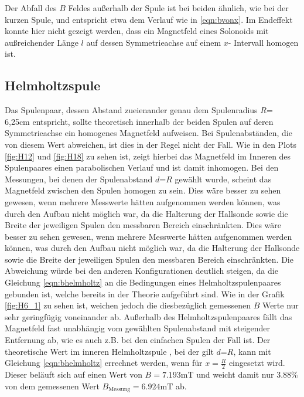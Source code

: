         Der Abfall des $B$ Feldes außerhalb der Spule ist bei beiden ähnlich, wie bei der kurzen Spule, und entspricht etwa dem Verlauf
        wie in \eqref{eqn:bvonx}. 
        Im Endeffekt konnte hier nicht gezeigt werden, dass ein Magnetfeld eines Solonoids mit außreichender Länge $l$ auf dessen
        Symmetrieachse auf einem $x$- Intervall homogen ist. 


    \subsection{Helmholtzspule}
        Das Spulenpaar, dessen Abstand zueienander genau dem Spulenradius $R$= 6,25\si{\centi\meter} entspricht, sollte theoretisch innerhalb
        der beiden Spulen auf deren Symmetrieachse ein homogenes Magnetfeld aufweisen. Bei Spulenabständen, die von diesem Wert abweichen,
        ist dies in der Regel nicht der Fall. Wie in den Plots \ref{fig:H12} und \ref{fig:H18} zu sehen ist, zeigt hierbei das Magnetfeld
        im Inneren des Spulenpaares einen parabolischen Verlauf und ist damit inhomogen. 
        Bei den Messungen, bei denen der Spulenabstand $d$=$R$ gewählt wurde, scheint das Magnetfeld zwischen den Spulen homogen zu sein.
        Dies wäre besser zu sehen gewesen, wenn mehrere Messwerte hätten aufgenommen werden können, was durch den Aufbau nicht möglich war, 
        da die Halterung der Hallsonde sowie die Breite der jeweiligen Spulen den messbaren Bereich einschränkten.
        Dies wäre besser zu sehen gewesen, wenn mehrere Messwerte hätten aufgenommen werden können, was durch den Aufbau nicht möglich war, 
        da die Halterung der Hallsonde sowie die Breite der jeweiligen Spulen den messbaren Bereich einschränkten. Die Abweichung würde bei den anderen Konfigurationen deutlich steigen, da die Gleichung \eqref{eqn:bhelmholtz} an die
        Bedingungen eines Helmholtzspulenpaares gebunden ist, welche bereits in der Theorie aufgeführt sind. 
        Wie in der Grafik \ref{fig:H6_1}
        zu sehen ist, weichen jedoch die diesbezüglich gemessenen $B$ Werte nur sehr geringfügig voneinander ab.
        Außerhalb des Helmholtzspulenpaares fällt das Magnetfeld fast unabhängig vom gewählten Spulenabstand mit steigender Entfernung ab, 
        wie es auch z.B. bei den einfachen Spulen der Fall ist.
        Der theoretische Wert im inneren Helmholtzspule , bei der gilt $d$=$R$, kann mit Gleichung \eqref{eqn:bhelmholtz} errechnet werden, wenn für $x=\frac{R}{2}$
        eingesetzt wird. Dieser beläuft sich auf einen Wert von $B=7.193\si{\milli\tesla}$ und weicht damit nur $3.88$\% von dem gemessenen Wert
        $B_{\text{Messung}}=6.924\si{\milli\tesla}$ ab.

